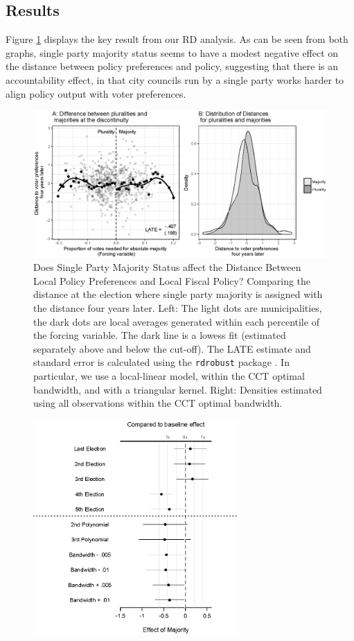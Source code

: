 \documentclass[a4paper,12pt]{article}
\begin{document}
\subsection{Results}

Figure 	\ref{fig:PermTest} displays the key result from our RD analysis. As can be seen from both graphs, single party majority status seems to have a modest negative effect on the distance between policy preferences and policy, suggesting that there is an accountability effect, in that city councils run by a single party works harder to align policy output with voter preferences. 


	\begin{figure}[h]
		\centering
		\includegraphics[width=1\textwidth]{rddCongruence.eps}
		\caption{Does Single Party Majority Status affect the Distance Between Local Policy Preferences and Local Fiscal Policy? Comparing the distance at the election where single party majority is assigned with the distance four years later. Left: The light dots are municipalities, the dark dots are local averages generated within each percentile of the forcing variable. The dark line is a lowess fit (estimated separately above and below the cut-off). The LATE estimate  and standard error is calculated using the \texttt{rdrobust} package \cite{calonico2015rdrobust}. In particular, we use a local-linear model, within the CCT optimal bandwidth, and with a triangular kernel. Right: Densities estimated using all observations within the CCT optimal bandwidth.}
		\label{fig:PermTest}
	\end{figure} \begin{figure}[htbp]
	\centering
	\includegraphics[width=0.7\textwidth]{New_robustness_rd3.eps}

\end{figure}
\end{document}
